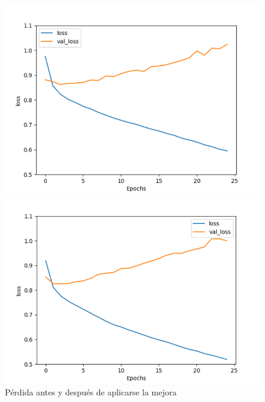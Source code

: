 \documentclass[a4]{sciposter}
\begin{document}
\begin{multicols}{3}
\begin{figure}[!tbp]
  \centering
  \begin{minipage}[b]{0.45\textwidth}
    \includegraphics[width=1.05\textwidth]{img/Loss Before.png}
  \end{minipage}
  \hfill
  \begin{minipage}[b]{0.45\textwidth}
    \includegraphics[width=1.05\textwidth]{img/Loss After.png}
  \end{minipage}
  \caption{Pérdida antes y después de aplicarse la mejora}
\end{figure}




\end{multicols}
\end{document}
